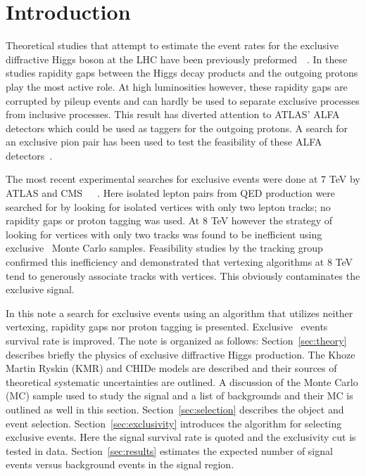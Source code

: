 \section{Introduction}
\label{sec:introduction}

\par Theoretical studies that attempt to
estimate the event rates for the exclusive diffractive Higgs boson at
the LHC have been previously preformed~\cite{Hdijet}~\cite{canLHC}. 
In these studies rapidity gaps between
the Higgs decay products and the outgoing protons play the most active
role. At high luminosities however, these rapidity gaps are corrupted
by pileup events and can hardly be used to separate exclusive processes from 
inclusive processes. This result has diverted attention to ATLAS' ALFA detectors
which could be used as taggers for the outgoing protons. A search for an
exclusive pion pair has been used to test the feasibility of these ALFA 
detectors~\cite{pionPair}. 
 
\par The most recent experimental searches for exclusive events were done
 at 7 TeV by ATLAS and CMS~\cite{CMSmumu}~\cite{CMSee}~\cite{MonteNote}.
Here isolated lepton pairs from QED production were searched for by looking 
for isolated vertices with only two lepton tracks; no rapidity gaps or 
proton tagging was used. At 8 TeV however the strategy of looking for 
vertices with only two tracks was found to be inefficient using exclusive 
\HWWll\ Monte Carlo samples. Feasibility studies by the tracking group confirmed 
this inefficiency and demonstrated that vertexing algorithms at 8 TeV 
tend to generously associate tracks with vertices. This obviously contaminates the exclusive signal.  

\par In this note a search for exclusive events using an 
algorithm that utilizes neither vertexing, rapidity gaps nor proton tagging is presented. 
Exclusive \HWWll\ events survival rate is improved. 
The note is organized as follows: Section~\ref{sec:theory} 
describes briefly the physics of exclusive diffractive Higgs production.
The Khoze Martin Ryskin (KMR) and CHIDe models are described and their 
sources of theoretical systematic uncertainties are outlined. A discussion of 
the Monte Carlo (MC) sample used to study the signal and a list of backgrounds 
and their MC is outlined as well in this section. Section~\ref{sec:selection} 
describes the object and event selection. Section~\ref{sec:exclusivity} 
introduces the algorithm for selecting exclusive events. Here the signal 
survival rate is quoted and the exclusivity cut is tested in data. Section~\ref{sec:results} 
estimates the expected number of signal events versus background events 
in the signal region.   
